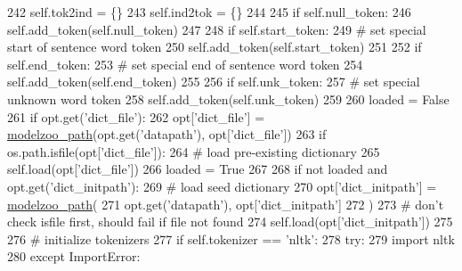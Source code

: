 \begin{DoxyCode}
242             self.tok2ind = \{\}
243             self.ind2tok = \{\}
244 
245             \textcolor{keywordflow}{if} self.null\_token:
246                 self.add\_token(self.null\_token)
247 
248             \textcolor{keywordflow}{if} self.start\_token:
249                 \textcolor{comment}{# set special start of sentence word token}
250                 self.add\_token(self.start\_token)
251 
252             \textcolor{keywordflow}{if} self.end\_token:
253                 \textcolor{comment}{# set special end of sentence word token}
254                 self.add\_token(self.end\_token)
255 
256             \textcolor{keywordflow}{if} self.unk\_token:
257                 \textcolor{comment}{# set special unknown word token}
258                 self.add\_token(self.unk\_token)
259 
260             loaded = \textcolor{keyword}{False}
261             \textcolor{keywordflow}{if} opt.get(\textcolor{stringliteral}{'dict\_file'}):
262                 opt[\textcolor{stringliteral}{'dict\_file'}] = \hyperlink{namespaceparlai_1_1agents_1_1legacy__agents_1_1seq2seq_1_1utils__v0_a5fbd3301b67f00d6d146fb01c7cd7626}{modelzoo\_path}(opt.get(\textcolor{stringliteral}{'datapath'}), opt[\textcolor{stringliteral}{'dict\_file'}])
263                 \textcolor{keywordflow}{if} os.path.isfile(opt[\textcolor{stringliteral}{'dict\_file'}]):
264                     \textcolor{comment}{# load pre-existing dictionary}
265                     self.load(opt[\textcolor{stringliteral}{'dict\_file'}])
266                     loaded = \textcolor{keyword}{True}
267 
268             \textcolor{keywordflow}{if} \textcolor{keywordflow}{not} loaded \textcolor{keywordflow}{and} opt.get(\textcolor{stringliteral}{'dict\_initpath'}):
269                 \textcolor{comment}{# load seed dictionary}
270                 opt[\textcolor{stringliteral}{'dict\_initpath'}] = \hyperlink{namespaceparlai_1_1agents_1_1legacy__agents_1_1seq2seq_1_1utils__v0_a5fbd3301b67f00d6d146fb01c7cd7626}{modelzoo\_path}(
271                     opt.get(\textcolor{stringliteral}{'datapath'}), opt[\textcolor{stringliteral}{'dict\_initpath'}]
272                 )
273                 \textcolor{comment}{# don't check isfile first, should fail if file not found}
274                 self.load(opt[\textcolor{stringliteral}{'dict\_initpath'}])
275 
276         \textcolor{comment}{# initialize tokenizers}
277         \textcolor{keywordflow}{if} self.tokenizer == \textcolor{stringliteral}{'nltk'}:
278             \textcolor{keywordflow}{try}:
279                 \textcolor{keyword}{import} nltk
280             \textcolor{keywordflow}{except} ImportError:

\end{DoxyCode}
